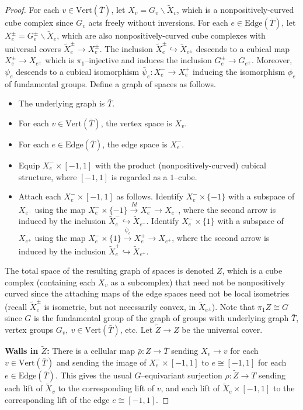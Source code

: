 \documentclass[11pt,oneside]{amsart}
\theoremstyle{definition}
\newcommand{\vertices}{\mathrm{Vert}}
\newcommand{\edges}{\mathrm{Edge}}
\begin{document}
\begin{proof}
For each $v\in\vertices(\bar T)$, let $X_v=G_v\backslash \widetilde X_v$, which is a nonpositively-curved cube complex since $G_v$ acts freely without inversions.  For each $e\in\edges(\bar T)$, let $X_e^\pm=G_e^{\pm}\backslash \widetilde X_e$, which are also nonpositively-curved cube complexes with universal covers $\widetilde X_e^\pm\to X_e^\pm$.  The inclusion $\widetilde X_e^\pm\hookrightarrow\widetilde X_{e^\pm}$ descends to a cubical map $X_e^\pm\to X_{e^\pm}$ which is $\pi_1$--injective and induces the inclusion $G_e^\pm\to G_{e^\pm}$.  Moreover, $\psi_e$ descends to a cubical isomorphism $\bar\psi_e:X_e^-\to X_e^+$ inducing the isomorphism $\phi_e$ of fundamental groups. Define a graph of spaces as follows.
\begin{itemize}
 \item The underlying graph is $\bar T$.
 \item For each $v\in\vertices(\bar T)$, the vertex space is $X_v$.
 \item For each $e\in\edges(\bar T)$, the edge space is $X_e^-$.
 \item Equip $X_e^-\times[-1,1]$ with the product (nonpositively-curved) cubical structure, where $[-1,1]$ is regarded as a $1$--cube.
 \item Attach each $X_e^-\times[-1,1]$ as follows.  Identify $X_e^{-}\times\{-1\}$ with a subspace of $X_{e^-}$ using the map $X_e^-\times\{-1\}\stackrel{Id}{\longrightarrow}X_e^-\to X_{e^-}$, where the second arrow is induced by the inclusion $\widetilde X_e^-\hookrightarrow \widetilde X_{e^-}$.  Identify $X_e^-\times\{1\}$ with a subspace of $X_{e^+}$ using the map $X_e^-\times\{1\}\stackrel{\bar\psi_e}{\longrightarrow} X_e^+\to X_{e^+}$, where the second arrow is induced by the inclusion $\widetilde X_e^+\hookrightarrow\widetilde X_{e^+}$.
\end{itemize}
The total space of the resulting graph of spaces is denoted $Z$, which is a cube complex (containing each $X_v$ as a subcomplex) that need not be nonpositively curved since the attaching maps of the edge spaces need not be local isometries (recall $\widetilde X_e^\pm$ is isometric, but not necessarily convex, in $\widetilde X_{e^\pm}$).  Note that $\pi_1Z\cong G$ since $G$ is the fundamental group of the graph of groups with underlying graph $\bar T$, vertex groups $G_v,\ v\in\vertices(\bar T)$, etc.  Let $\widetilde Z\to Z$ be the universal cover.

\textbf{Walls in $\widetilde Z$:}  There is a cellular map $\bar\rho:Z\to\bar T$ sending $X_v\to v$ for each $v\in\vertices(\bar T)$ and sending the image of $X_e^-\times[-1,1]$ to $e\cong [-1,1]$ for each $e\in\edges(\bar T)$.  This gives the usual $G$--equivariant surjection $\rho:\widetilde Z\to T$ sending each lift of $\widetilde X_v$ to the corresponding lift of $v$, and each lift of $\widetilde X_e\times[-1,1]$ to the corresponding lift of the edge $e\cong [-1,1]$.


\end{proof}
\end{document}
